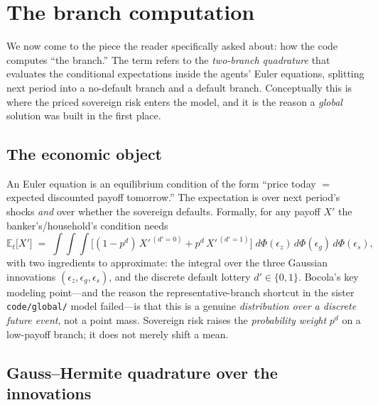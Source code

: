 \documentclass[11pt]{article}
\newcommand{\E}{\mathbb{E}}
\newcommand{\code}[1]{\texttt{#1}}
\begin{document}
\section{The branch computation}
\label{sec:branch}

We now come to the piece the reader specifically asked about: how the code
computes ``the branch.'' The term refers to the \emph{two-branch quadrature}
that evaluates the conditional expectations inside the agents' Euler
equations, splitting next period into a no-default branch and a default
branch. Conceptually this is where the priced sovereign risk enters the
model, and it is the reason a \emph{global} solution was built in the first
place.

\subsection{The economic object}

An Euler equation is an equilibrium condition of the form
``price today $=$ expected discounted payoff tomorrow.'' The expectation is
over next period's shocks \emph{and} over whether the sovereign defaults.
Formally, for any payoff $X'$ the banker's/household's condition needs
\begin{equation}
\E_t\big[X'\big] \;=\;
\int\!\!\int\!\!\int
\Big[(1-p^d)\,X'^{\,(d'=0)} + p^d\,X'^{\,(d'=1)}\Big]\;
d\Phi(\epsilon_z)\,d\Phi(\epsilon_g)\,d\Phi(\epsilon_s),
\label{eq:expect}
\end{equation}
with two ingredients to approximate: the integral over the three Gaussian
innovations $(\epsilon_z,\epsilon_g,\epsilon_s)$, and the discrete default
lottery $d'\in\{0,1\}$. Bocola's key modeling point---and the reason the
representative-branch shortcut in the sister \code{code/global/} model
failed---is that this is a genuine \emph{distribution over a discrete future
event}, not a point mass. Sovereign risk raises the \emph{probability weight}
$p^d$ on a low-payoff branch; it does not merely shift a mean.

\subsection{Gauss--Hermite quadrature over the innovations}
\end{document}
